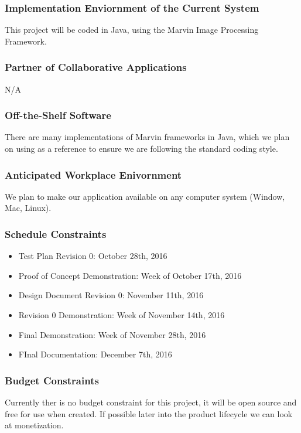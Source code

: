 \documentclass[12pt, titlepage]{article}
\begin{document}
\subsubsection{Implementation Enviornment of the Current System}

This project will be coded in Java, using the Marvin Image Processing Framework.

\subsubsection{Partner of Collaborative Applications}

N/A

\subsubsection{Off-the-Shelf Software}

There are many implementations of Marvin frameworks in Java, which we plan on using as a reference to ensure we are following the standard coding style.

\subsubsection{Anticipated Workplace Enivornment}

We plan to make our application available on any computer system (Window, Mac, Linux).

\subsubsection{Schedule Constraints}

\begin{itemize}
  \item Test Plan Revision 0: October 28th, 2016
  \item Proof of Concept Demonstration: Week of October 17th, 2016
  \item Design Document Revision 0: November 11th, 2016
  \item Revision 0 Demonstration: Week of November 14th, 2016
  \item Final Demonstration: Week of November 28th, 2016
  \item FInal Documentation: December 7th, 2016
\end{itemize}

\subsubsection{Budget Constraints}
Currently ther is no budget constraint for this project, it will be open source and free for use when created. If possible later into the product lifecycle we can look at monetization.
\end{document}
